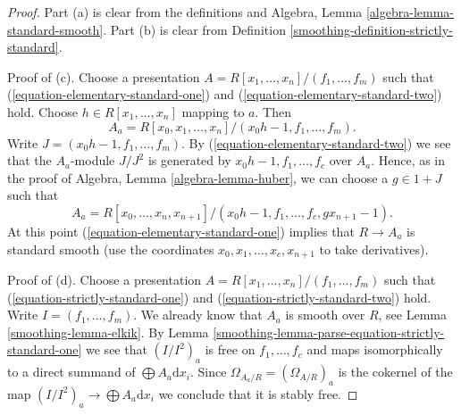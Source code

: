 \begin{proof}

Part (a) is clear from the definitions and
Algebra, Lemma \ref{algebra-lemma-standard-smooth}.
Part (b) is clear from Definition \ref{smoothing-definition-strictly-standard}.

\medskip\noindent
Proof of (c). Choose a presentation
$A = R[x_1, \ldots, x_n]/(f_1, \ldots, f_m)$ such that
(\ref{equation-elementary-standard-one}) and
(\ref{equation-elementary-standard-two}) hold.
Choose $h \in R[x_1, \ldots, x_n]$ mapping to $a$. Then
$$
A_a = R[x_0, x_1, \ldots, x_n]/(x_0h - 1, f_1, \ldots, f_m).
$$
Write $J = (x_0h - 1, f_1, \ldots, f_m)$.
By (\ref{equation-elementary-standard-two}) we see that the $A_a$-module
$J/J^2$ is generated by $x_0h - 1, f_1, \ldots, f_c$
over $A_a$. Hence, as in the proof of Algebra, Lemma \ref{algebra-lemma-huber},
we can choose a $g \in 1 + J$ such that
$$
A_a = R[x_0, \ldots, x_n, x_{n + 1}]/
(x_0h - 1, f_1, \ldots, f_c, gx_{n + 1} - 1).
$$
At this point (\ref{equation-elementary-standard-one})
implies that $R \to A_a$ is standard smooth (use the coordinates
$x_0, x_1, \ldots, x_c, x_{n + 1}$ to take derivatives).

\medskip\noindent
Proof of (d). Choose a presentation
$A = R[x_1, \ldots, x_n]/(f_1, \ldots, f_m)$ such that
(\ref{equation-strictly-standard-one}) and
(\ref{equation-strictly-standard-two}) hold.
Write $I = (f_1, \ldots, f_m)$.
We already know that $A_a$ is smooth over $R$, see
Lemma \ref{smoothing-lemma-elkik}. By
Lemma \ref{smoothing-lemma-parse-equation-strictly-standard-one}
we see that $(I/I^2)_a$ is free on $f_1, \ldots, f_c$
and maps isomorphically to a direct summand of
$\bigoplus A_a \text{d}x_i$. Since
$\Omega_{A_a/R} = (\Omega_{A/R})_a$
is the cokernel of the map
$(I/I^2)_a \to \bigoplus A_a \text{d}x_i$
we conclude that it is stably free.


\end{proof}
